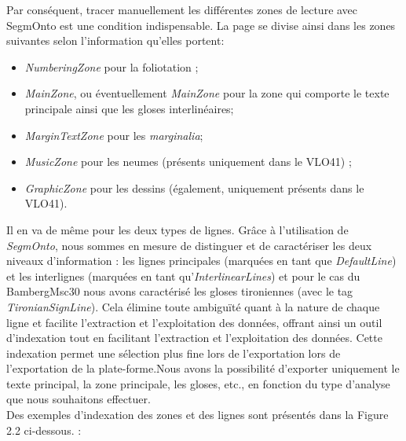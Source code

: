 \documentclass[a4paper, twoside, 12pt]{book}
\begin{document}
Par conséquent, tracer manuellement les différentes \og{} zones de lecture \fg{} avec SegmOnto est une condition indispensable. La page se divise ainsi dans les zones suivantes selon l'information qu'elles portent:

\begin{itemize}
    \item \textit{NumberingZone} pour la foliotation ;
    \item \textit{MainZone}, ou éventuellement \textit{MainZone} pour la zone qui comporte le texte principale ainsi que les gloses interlinéaires;
    \item \textit{MarginTextZone} pour les \textit{marginalia};
    \item \textit{MusicZone} pour les neumes (présents uniquement dans le VLO41) ;
    \item \textit{GraphicZone} pour les dessins (également, uniquement présents dans le VLO41).
\end{itemize}

Il en va de même pour les deux types de lignes. Grâce à l'utilisation de \textit{SegmOnto}, nous sommes en mesure de distinguer et de caractériser les deux niveaux d'information : les lignes principales (marquées en tant que \textit{DefaultLine}) et les interlignes (marquées en tant qu'\textit{InterlinearLines}) et pour le cas du BambergMsc30 nous avons caractérisé les gloses tironiennes (avec le tag \textit{TironianSignLine}). Cela élimine toute ambiguïté quant à la nature de chaque ligne et facilite l'extraction et l'exploitation des données, offrant ainsi un outil d'indexation tout en facilitant l'extraction et l'exploitation des données. Cette indexation permet une sélection plus fine lors de l'exportation lors de l'exportation de la plate-forme.Nous avons la possibilité d'exporter uniquement le texte principal, la zone principale, les gloses, etc., en fonction du type d'analyse que nous souhaitons effectuer. \\

Des exemples d'indexation des zones et des lignes sont présentés dans la Figure 2.2 ci-dessous. :\\
\end{document}
